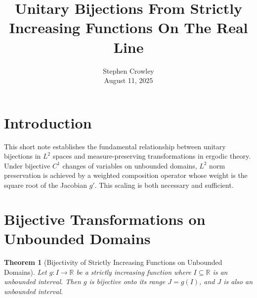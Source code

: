 \documentclass{article}
\newcommand{\tmaffiliation}[1]{\\ #1}
\newtheorem{theorem}{Theorem}
\begin{document}
{\cdot}\title{Unitary Bijections From Strictly Increasing Functions On The
Real Line}

\author{
  Stephen Crowley
  \tmaffiliation{August 11, 2025}
}

\maketitle

{\tableofcontents}

\section{Introduction}

This short note establishes the fundamental relationship between unitary
bijections in $L^2$ spaces and measure-preserving transformations in ergodic
theory. Under bijective $C^1$ changes of variables on unbounded domains, $L^2$
norm preservation is achieved by a weighted composition operator whose weight
is the square root of the Jacobian $g'$. This scaling is both necessary and
sufficient.

\section{Bijective Transformations on Unbounded Domains}

\begin{theorem}[Bijectivity of Strictly Increasing Functions on Unbounded
Domains]
  \label{thm:bijective_unbounded}Let $g : I \to \mathbb{R}$ be a strictly
  increasing function where $I \subseteq \mathbb{R}$ is an unbounded interval.
  Then $g$ is bijective onto its range $J = g (I)$, and $J$ is also an
  unbounded interval.
\end{theorem}
\end{document}
